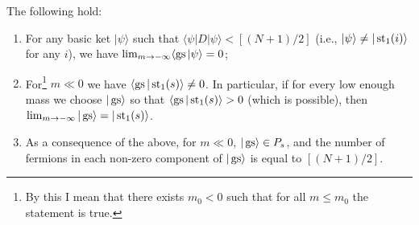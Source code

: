 \begin{lemma} \label{l:gs_conv_neg}
The following hold:
\begin{enumerate}
\item For any basic ket $|\psi\rangle$ such that $\langle \psi |D|\psi\rangle < [(N+1)/2]$ (i.e., $|\psi\rangle \neq |\operatorname{st}_1(i)\rangle$ for any $i$), we have $\lim_{m \rightarrow -\infty} \langle \operatorname{gs} | \psi \rangle = 0$;
\item For\footnote{By this I mean that there exists $m_0 < 0$ such that for all $m \leq m_0$ the statement is true.} $m \ll 0$ we have $\left\langle \operatorname{gs} | \operatorname{st}_1(s) \right\rangle \neq 0$. In particular, if for every low enough mass we choose $|\operatorname{gs}\rangle$ so that $\langle \operatorname{gs} | \operatorname{st}_1(s) \rangle > 0$ (which is possible), then $\lim_{m \rightarrow -\infty} |\operatorname{gs}\rangle = |\operatorname{st}_1(s)\rangle$. 
\item As a consequence of the above, for $m \ll 0$, $|\operatorname{gs}\rangle \in P_s$, and the number of fermions in each non-zero component of $|\operatorname{gs}\rangle$ is equal to $[(N+1)/2]$.
\end{enumerate}
\end{lemma}

